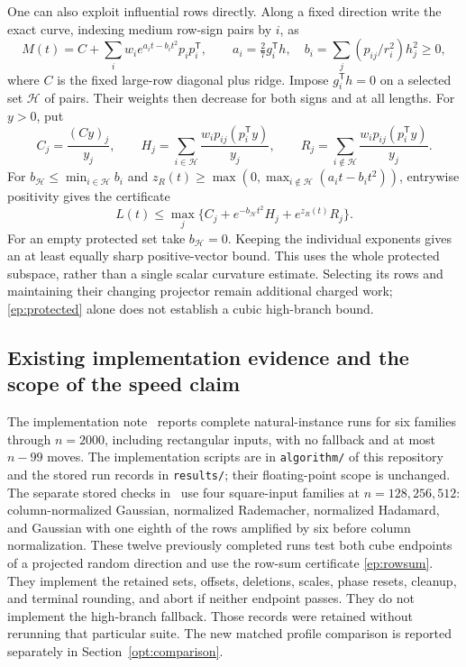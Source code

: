 \documentclass[11pt]{amsart}
\theoremstyle{definition}\newtheorem{definition}[theorem]{Definition}
\theoremstyle{remark}\newtheorem{remark}[theorem]{Remark}
\numberwithin{equation}{section}
\newcommand{\T}{\mathsf T}
\begin{document}
One can also exploit influential rows directly. Along a fixed direction
write the exact curve, indexing medium row-sign pairs by $i$, as
\[
 M(t)=C+\sum_i w_i e^{a_it-b_it^2}p_ip_i^\T,
 \qquad a_i=\tfrac27g_i^\T h,\quad
 b_i=\sum_j(p_{ij}/r_i^2)h_j^2\ge0,
\]
where $C$ is the fixed large-row diagonal plus ridge. Impose
$g_i^\T h=0$ on a selected set $\mathcal H$ of pairs. Their weights
then decrease for both signs and at all lengths. For $y>0$, put
\[
 C_j=\frac{(Cy)_j}{y_j},\qquad
 H_j=\sum_{i\in\mathcal H}\frac{w_i p_{ij}(p_i^\T y)}{y_j},\qquad
 R_j=\sum_{i\notin\mathcal H}\frac{w_i p_{ij}(p_i^\T y)}{y_j}.
\]
For $b_{\mathcal H}\le\min_{i\in\mathcal H}b_i$ and
$z_R(t)\ge\max(0,\max_{i\notin\mathcal H}(a_it-b_it^2))$,
entrywise positivity gives the certificate
\begin{equation}\label{ep:protected}
 L(t)\le\max_j\{C_j+e^{-b_{\mathcal H}t^2}H_j+e^{z_R(t)}R_j\}.
\end{equation}
For an empty protected set take $b_{\mathcal H}=0$.
Keeping the individual exponents gives an at least equally sharp
positive-vector bound. This uses the whole protected subspace, rather
than a single scalar curvature estimate. Selecting its rows and
maintaining their changing projector remain additional charged work;
\eqref{ep:protected} alone does not establish a cubic high-branch bound.

\subsection{Existing implementation evidence and the scope of the speed claim}
\label{ep:evidence}
The implementation note~\cite{CertSteps} reports complete natural-instance
runs for six families through $n=2000$, including rectangular inputs,
with no fallback and at most $n-99$ moves. The implementation scripts are
in \texttt{algorithm/} of this repository and the stored run records in
\texttt{results/}; their floating-point scope is unchanged. The separate stored checks
in~\cite{CertAnalysis} use four square-input families at
$n=128,256,512$: column-normalized Gaussian, normalized Rademacher,
normalized Hadamard, and Gaussian with one eighth of the rows amplified
by six before column normalization. These twelve previously completed
runs test both cube endpoints of a projected random direction and use
the row-sum certificate \eqref{ep:rowsum}. They implement the retained
sets, offsets, deletions, scales, phase resets, cleanup, and terminal
rounding, and abort if neither endpoint passes. They do not implement
the high-branch fallback. Those records were retained without rerunning that particular suite.
The new matched profile comparison is reported separately in
Section~\ref{opt:comparison}.
\end{document}
